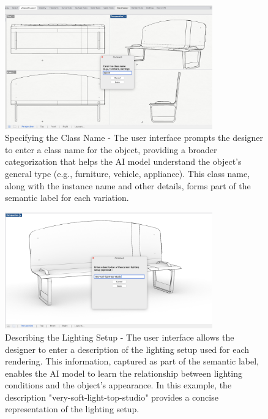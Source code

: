 \documentclass[12pt]{article}
\begin{document}
\begin{figure}[h]
    \centering
    \includegraphics[width=0.8\textwidth]{figures/figure-process-class-name-bench-4up-bw.jpg}
    \caption{Specifying the Class Name - The user interface prompts the designer to enter a class name for the object, providing a broader categorization that helps the AI model understand the object's general type (e.g., furniture, vehicle, appliance). This class name, along with the instance name and other details, forms part of the semantic label for each variation.}
    \label{fig:class_name_input}
\end{figure}

\begin{figure}[h]
    \centering
    \includegraphics[width=0.8\textwidth]{figures/figure-process-light-description-monochrome.jpg}
    \caption{Describing the Lighting Setup - The user interface allows the designer to enter a description of the lighting setup used for each rendering. This information, captured as part of the semantic label, enables the AI model to learn the relationship between lighting conditions and the object's appearance. In this example, the description "very-soft-light-top-studio" provides a concise representation of the lighting setup.}
    \label{fig:lighting_description_input}
\end{figure}
\end{document}
